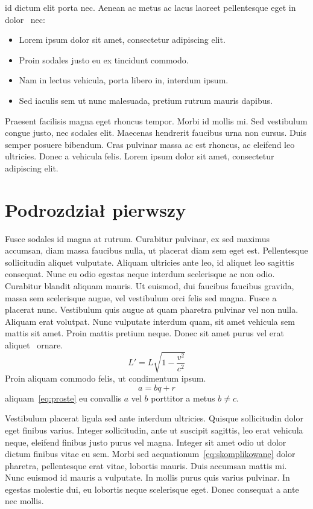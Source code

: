 \documentclass[polish,engineering]{wizthesis}
\begin{document}
id dictum elit porta nec. Aenean ac metus ac lacus laoreet pellentesque eget in
dolor~\cite[chap. 2]{latexcompanion} nec:
\begin{itemize}[noitemsep]
  \item Lorem ipsum dolor sit amet, consectetur adipiscing elit.
  \item Proin sodales justo eu ex tincidunt commodo.
  \item Nam in lectus vehicula, porta libero in, interdum ipsum.
  \item Sed iaculis sem ut nunc malesuada, pretium rutrum mauris dapibus.
\end{itemize}
Praesent facilisis magna eget rhoncus tempor. Morbi id mollis mi. Sed vestibulum
congue justo, nec sodales elit. Maecenas hendrerit faucibus urna non cursus.
Duis semper posuere bibendum. Cras pulvinar massa ac est rhoncus, ac eleifend
leo ultricies. Donec a vehicula felis. Lorem ipsum dolor sit amet, consectetur
adipiscing elit.

\section{Podrozdział pierwszy}

Fusce sodales id magna at rutrum. Curabitur pulvinar, ex sed maximus accumsan,
diam massa faucibus nulla, ut placerat diam sem eget est. Pellentesque
sollicitudin aliquet vulputate. Aliquam ultricies ante leo, id aliquet leo
sagittis consequat. Nunc eu odio egestas neque interdum scelerisque ac non odio.
Curabitur blandit aliquam mauris. Ut euismod, dui faucibus faucibus gravida,
massa sem scelerisque augue, vel vestibulum orci felis sed magna. Fusce a
placerat nunc. Vestibulum quis augue at quam pharetra pulvinar vel non nulla.
Aliquam erat volutpat. Nunc vulputate interdum quam, sit amet vehicula sem
mattis sit amet. Proin mattis pretium neque. Donec sit amet purus vel erat
aliquet~\cite{einstein} ornare.
\begin{equation} \label{eq:skomplikowane}
  L' = {L}{\sqrt{1-\frac{v^2}{c^2}}}
\end{equation}
Proin aliquam commodo felis, ut condimentum ipsum.
\begin{equation} \label{eq:proste}
  a = bq + r
\end{equation}
aliquam~\eqref{eq:proste} eu convallis \(a\) vel \(b\) porttitor a metus \(b
\neq c\).

Vestibulum placerat ligula sed ante interdum ultricies. Quisque sollicitudin
dolor eget finibus varius. Integer sollicitudin, ante ut suscipit sagittis, leo
erat vehicula neque, eleifend finibus justo purus vel magna. Integer sit amet
odio ut dolor dictum finibus vitae eu sem. Morbi sed
aequationum~\eqref{eq:skomplikowane} dolor pharetra, pellentesque erat vitae,
lobortis mauris. Duis accumsan mattis mi. Nunc euismod id mauris a vulputate. In
mollis purus quis varius pulvinar. In egestas molestie dui, eu lobortis neque
scelerisque eget. Donec consequat a ante nec mollis.
\end{document}
